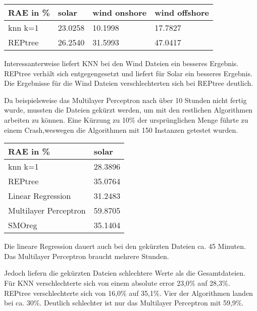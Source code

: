 \documentclass[letterpaper]{article} %
\begin{document}
    \begin{center}
        \begin{tabular}{|l||l|l|l|}
            \hline
            RAE in \%&solar&wind onshore&wind offshore\\
            \hline
            \hline
            knn k=1&23.0258&10.1998&17.7827\\
            \hline
            REPtree&26.2540&31.5993&47.0417\\
            \hline
        \end{tabular}
    \end{center}
    Interessanterweise liefert KNN bei den Wind Dateien ein besseres Ergebnis. REPtree verhält sich entgegengesetzt und liefert für Solar ein besseres Ergebnis. Die Ergebnisse für die Wind Dateien verschlechterten sich bei REPtree deutlich. 

    Da beispielsweise das Multilayer Perceptron nach über 10 Stunden nicht fertig wurde, mussten die Dateien gekürzt werden, um mit den restlichen Algorithmen arbeiten zu können. Eine Kürzung zu 10\% der ursprünglichen Menge führte zu einem Crash,weswegen die Algorithmen mit 150 Instanzen getestet wurden. 

    \begin{center}
        \begin{tabular}{|l||l|}
            \hline
            RAE in \%&solar\\
            \hline
            \hline
            knn k=1&28.3896\\
            \hline
            REPtree&35.0764\\
            \hline
            Linear Regression&31.2483\\
            \hline
            Multilayer Perceptron&59.8705\\
            \hline
            SMOreg&35.1404\\
            \hline
        \end{tabular}
    \end{center}
    Die lineare Regression dauert auch bei den gekürzten Dateien ca. 45 Minuten. Das Multilayer Perceptron braucht mehrere Stunden.

    Jedoch liefern die gekürzten Dateien schlechtere Werte als die Gesamtdateien. Für KNN verschlechterte sich von einem absolute error 23,0\% auf 28,3\%. REPtree verschlechterte sich von 16,0\% auf 35,1\%. Vier der Algorithmen landen bei ca. 30\%. Deutlich schlechter ist nur das Multilayer Perceptron mit 59,9\%.
\end{document}
